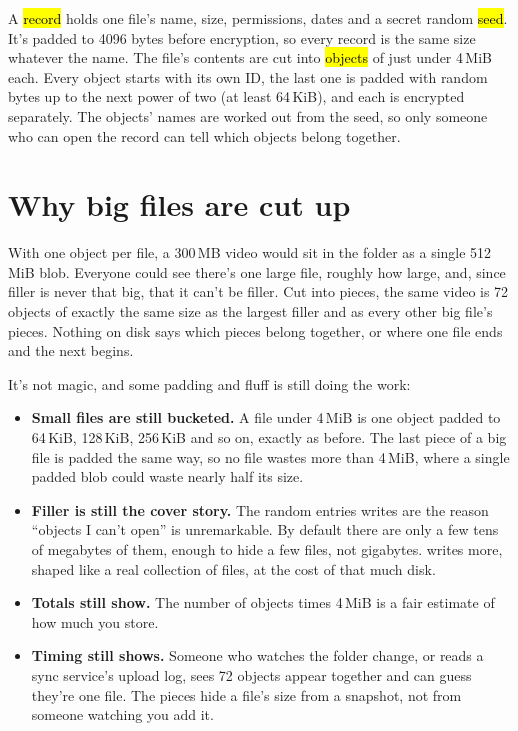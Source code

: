 \documentclass[10pt,oneside,openany]{book}
\begin{document}
A \hl{record} holds one file's name, size, permissions, dates and a secret
random \hl{seed}. It's padded to 4096 bytes before encryption, so every
record is the same size whatever the name. The file's contents are cut into
\hl{objects} of just under 4\,MiB each. Every object starts with its own ID,
the last one is padded with random bytes up to the next power of two (at
least 64\,KiB), and each is encrypted separately. The objects' names are
worked out from the seed, so only someone who can open the record can tell
which objects belong together.


\section{Why big files are cut up}

With one object per file, a 300\,MB video would sit in the folder as a
single 512\,MiB blob. Everyone could see there's one large file, roughly how
large, and, since filler is never that big, that it can't be filler. Cut
into pieces, the same video is 72 objects of exactly the same size as the
largest filler and as every other big file's pieces. Nothing on disk says
which pieces belong together, or where one file ends and the next begins.

It's not magic, and some padding and fluff is still doing the work:

\begin{itemize}
  \item \textbf{Small files are still bucketed.} A file under 4\,MiB is one
        object padded to 64\,KiB, 128\,KiB, 256\,KiB and so on, exactly as
        before. The last piece of a big file is padded the same way, so no
        file wastes more than 4\,MiB, where a single padded blob could
        waste nearly half its size.
  \item \textbf{Filler is still the cover story.} The random entries
         writes are the reason ``objects I can't open'' is
        unremarkable. By default there are only a few tens of megabytes of
        them, enough to hide a few files, not gigabytes.  writes more, shaped like a real collection of
        files, at the cost of that much disk.
  \item \textbf{Totals still show.} The number of objects times 4\,MiB is
        a fair estimate of how much you store.
  \item \textbf{Timing still shows.} Someone who watches the folder change,
        or reads a sync service's upload log, sees 72 objects appear together
        and can guess they're one file. The pieces hide a file's size from a
        snapshot, not from someone watching you add it.
\end{itemize}
\end{document}
